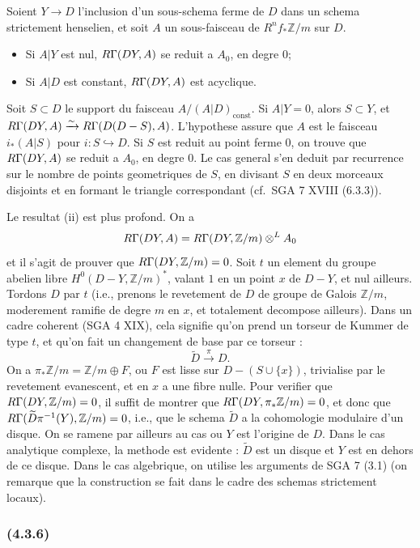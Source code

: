 \documentclass[12pt,a4paper]{article}
\theoremstyle{plain}
\theoremstyle{definition}
\theoremstyle{remark}
\newcommand{\const}{\text{const}}
\let\mod\relax
\DeclareMathOperator{\mod}{mod}
\newcommand{\bbZ}{\mathbb{Z}}
\begin{document}
Soient $Y \to D$ l'inclusion d'un sous-schema ferme de $D$ dans un schema strictement henselien, et soit $A$ un sous-faisceau de $R^n f_* \bbZ/m$ sur $D$.
\begin{itemize}
\item[(i)] Si $A|Y$ est nul, $R\Gamma(D \mod Y, A)$ se reduit a $A_0$, en degre $0$;
\item[(ii)] Si $A|D$ est constant, $R\Gamma(D \mod Y, A)$ est acyclique.
\end{itemize}

Soit $S \subset D$ le support du faisceau $A/(A|D)_{\const}$. Si $A|Y = 0$, alors $S \subset Y$, et $R\Gamma(D \mod Y, A) \xrightarrow{\sim} R\Gamma(D \mod (D - S), A)$. L'hypothese assure que $A$ est le faisceau $i_*(A|S)$ pour $i : S \hookrightarrow D$. Si $S$ est reduit au point ferme $0$, on trouve que $R\Gamma(D \mod Y, A)$ se reduit a $A_0$, en degre $0$. Le cas general s'en deduit par recurrence sur le nombre de points geometriques de $S$, en divisant $S$ en deux morceaux disjoints et en formant le triangle correspondant (cf.~SGA 7 XVIII (6.3.3)).

Le resultat (ii) est plus profond. On a
\[
R\Gamma(D \mod Y, A) = R\Gamma(D \mod Y, \bbZ/m) \otimes^L A_0
\]
et il s'agit de prouver que $R\Gamma(D \mod Y, \bbZ/m) = 0$. Soit $t$ un element du groupe abelien libre $H^0(D - Y, \bbZ/m)^*$, valant $1$ en un point $x$ de $D - Y$, et nul ailleurs. Tordons $D$ par $t$ (i.e., prenons le revetement de $D$ de groupe de Galois $\bbZ/m$, moderement ramifie de degre $m$ en $x$, et totalement decompose ailleurs). Dans un cadre coherent (SGA 4 XIX), cela signifie qu'on prend un torseur de Kummer de type $t$, et qu'on fait un changement de base par ce torseur :
\[
\widetilde{D} \xrightarrow{\pi} D.
\]
On a $\pi_*\bbZ/m = \bbZ/m \oplus F$, ou $F$ est lisse sur $D - (S \cup \{x\})$, trivialise par le revetement evanescent, et en $x$ a une fibre nulle. Pour verifier que $R\Gamma(D \mod Y, \bbZ/m) = 0$, il suffit de montrer que $R\Gamma(D \mod Y, \pi_*\bbZ/m) = 0$, et donc que $R\Gamma(\widetilde{D} \mod \pi^{-1}(Y), \bbZ/m) = 0$, i.e., que le schema $\widetilde{D}$ a la cohomologie modulaire d'un disque. On se ramene par ailleurs au cas ou $Y$ est l'origine de $D$. Dans le cas analytique complexe, la methode est evidente : $\widetilde{D}$ est un disque et $Y$ est en dehors de ce disque. Dans le cas algebrique, on utilise les arguments de SGA 7 (3.1) (on remarque que la construction se fait dans le cadre des schemas strictement locaux).

\subsubsection*{\textup{(4.3.6)}}
\end{document}
